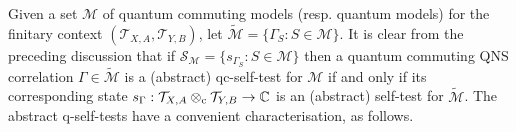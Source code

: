 \documentclass[11pt]{amsart}
\theoremstyle{definition}
\newcommand{\cl}[1]{\mathcal{#1}}
\newcommand{\bb}[1]{\mathbb{#1}}
\begin{document}

Given a set $\cl M$ of quantum commuting models (resp. 
quantum models) for the finitary context 
$(\cl T_{X,A},\cl T_{Y,B})$, let $\tilde{\cl M} = \{\Gamma_S : S\in \cl M\}$. 
It is clear from the preceding discussion that 
if  
$\cl S_{\cl M} = \{s_{\Gamma_S} : S\in \cl M\}$ then a quantum commuting QNS correlation $\Gamma\in \tilde{\cl M}$
is a (abstract) qc-self-test for $\cl M$ if and only if 
its corresponding state 
$s_{\Gamma} : \cl T_{X,A}\otimes_{\rm c}\cl T_{Y,B}\to \bb{C}$ is an (abstract) self-test for 
$\tilde{\cl M}$. 
The abstract q-self-tests have a convenient characterisation, as follows.


\end{document}

